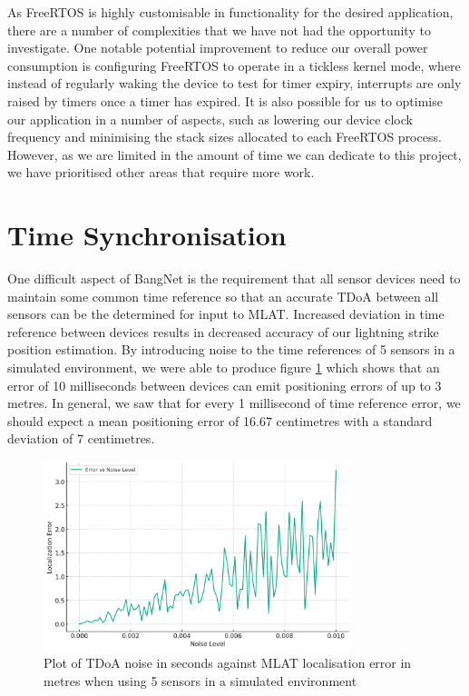 \documentclass[conference]{IEEEtran}
\begin{document}
As FreeRTOS is highly customisable in functionality for the desired application, there are a number of complexities that we have not had the opportunity to investigate. One notable potential improvement to reduce our overall power consumption is configuring FreeRTOS to operate in a tickless kernel mode, where instead of regularly waking the device to test for timer expiry, interrupts are only raised by timers once a timer has expired. It is also possible for us to optimise our application in a number of aspects, such as lowering our device clock frequency and minimising the stack sizes allocated to each FreeRTOS process. However, as we are limited in the amount of time we can dedicate to this project, we have prioritised other areas that require more work.

\section{Time Synchronisation} \label{synchronisation}

One difficult aspect of BangNet is the requirement that all sensor devices need to maintain some common time reference so that an accurate TDoA between all sensors can be the determined for input to MLAT. Increased deviation in time reference between devices results in decreased accuracy of our lightning strike position estimation. By introducing noise to the time references of 5 sensors in a simulated environment, we were able to produce figure \ref{precision_figure} which shows that an error of 10 milliseconds between devices can emit positioning errors of up to 3 metres. In general, we saw that for every 1 millisecond of time reference error, we should expect a mean positioning error of 16.67 centimetres with a standard deviation of 7 centimetres.

\begin{figure}[ht]
\centerline{\includegraphics[width=90mm]{images/precision.png}}
\caption{Plot of TDoA noise in seconds against MLAT localisation error in metres when using 5 sensors in a simulated environment}
\label{precision_figure}
\end{figure}
\end{document}
